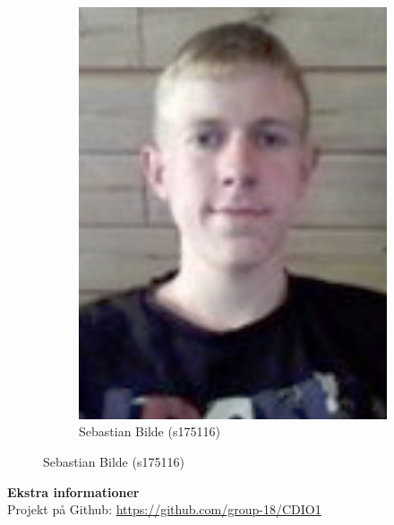 \begin{figure}[H]
\begin{subfigure}{0.25\textwidth}
		\includegraphics[width=\linewidth]{graphics/members/sebastian}
		\caption*{Sebastian Bilde (s175116)}
	\end{subfigure}
\end{figure}

\vspace{1.2cm}
\noindent
{\huge\textbf{Ekstra informationer}}\\

\noindent
Projekt på Github: \url{https://github.com/group-18/CDIO1}

